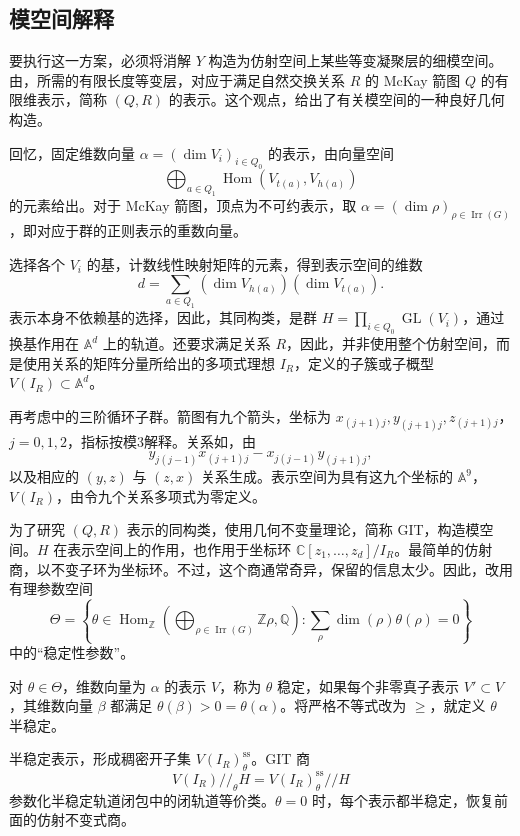 \subsection{模空间解释}\label{sec:4.7.3}

要执行这一方案，必须将消解 $Y$ 构造为仿射空间上某些等变凝聚层的细模空间。由，所需的有限长度等变层，对应于满足自然交换关系 $R$ 的 McKay 箭图 $Q$ 的有限维表示，简称 $(Q,R)$ 的表示。这个观点，给出了有关模空间的一种良好几何构造。

回忆，固定维数向量 $\alpha=(\dim V_i)_{i\in Q_0}$ 的表示，由向量空间
\[
\bigoplus_{a\in Q_1}\operatorname{Hom}(V_{t(a)},V_{h(a)})
\]
的元素给出。对于 McKay 箭图，顶点为不可约表示，取 $\alpha=(\dim\rho)_{\rho\in\operatorname{Irr}(G)}$，即对应于群的正则表示的重数向量。

选择各个 $V_i$ 的基，计数线性映射矩阵的元素，得到表示空间的维数
\[
d=\sum_{a\in Q_1}(\dim V_{h(a)})(\dim V_{t(a)}).
\]
表示本身不依赖基的选择，因此，其同构类，是群 $H=\prod_{i\in Q_0}\operatorname{GL}(V_i)$，通过换基作用在 $\mathbb{A}^d$ 上的轨道。还要求满足关系 $R$，因此，并非使用整个仿射空间，而是使用关系的矩阵分量所给出的多项式理想 $I_R$，定义的子簇或子概型 $V(I_R)\subset\mathbb{A}^d$。

\begin{example}\label{ex:4.87}
再考虑中的三阶循环子群。箭图有九个箭头，坐标为 $x_{(j+1)j},y_{(j+1)j},z_{(j+1)j}$，$j=0,1,2$，指标按模3解释。关系如，由
\[
y_{j(j-1)}x_{(j+1)j}-x_{j(j-1)}y_{(j+1)j},
\]
以及相应的 $(y,z)$ 与 $(z,x)$ 关系生成。表示空间为具有这九个坐标的 $\mathbb{A}^9$，$V(I_R)$，由令九个关系多项式为零定义。
\end{example}

为了研究 $(Q,R)$ 表示的同构类，使用几何不变量理论，简称 GIT，构造模空间。$H$ 在表示空间上的作用，也作用于坐标环 $\mathbb{C}[z_1,\ldots,z_d]/I_R$。最简单的仿射商，以不变子环为坐标环。不过，这个商通常奇异，保留的信息太少。因此，改用有理参数空间
\[
\Theta=\left\{\theta\in
\operatorname{Hom}_{\mathbb{Z}}\left(
\bigoplus_{\rho\in\operatorname{Irr}(G)}\mathbb{Z}\rho,\mathbb{Q}\right):
\sum_\rho\dim(\rho)\theta(\rho)=0\right\}
\]
中的“稳定性参数”。

\begin{definition*}\label{def:4.theta-stability}
对 $\theta\in\Theta$，维数向量为 $\alpha$ 的表示 $V$，称为 $\theta$ 稳定，如果每个非零真子表示 $V'\subset V$，其维数向量 $\beta$ 都满足 $\theta(\beta)>0=\theta(\alpha)$。将严格不等式改为 $\ge$，就定义 $\theta$ 半稳定。
\end{definition*}
半稳定表示，形成稠密开子集 $V(I_R)^{\mathrm{ss}}_\theta$。GIT 商
\[
V(I_R)\mathbin{//}_\theta H
=V(I_R)^{\mathrm{ss}}_\theta\mathbin{//}H
\]
参数化半稳定轨道闭包中的闭轨道等价类。$\theta=0$ 时，每个表示都半稳定，恢复前面的仿射不变式商。

